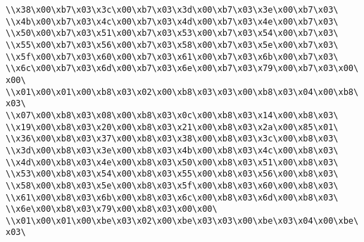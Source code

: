 \verb|\\x38\x00\xb7\x03\x3c\x00\xb7\x03\x3d\x00\xb7\x03\x3e\x00\xb7\x03\|\newline
\verb|\\x4b\x00\xb7\x03\x4c\x00\xb7\x03\x4d\x00\xb7\x03\x4e\x00\xb7\x03\|\newline
\verb|\\x50\x00\xb7\x03\x51\x00\xb7\x03\x53\x00\xb7\x03\x54\x00\xb7\x03\|\newline
\verb|\\x55\x00\xb7\x03\x56\x00\xb7\x03\x58\x00\xb7\x03\x5e\x00\xb7\x03\|\newline
\verb|\\x5f\x00\xb7\x03\x60\x00\xb7\x03\x61\x00\xb7\x03\x6b\x00\xb7\x03\|\newline
\verb|\\x6c\x00\xb7\x03\x6d\x00\xb7\x03\x6e\x00\xb7\x03\x79\x00\xb7\x03\x00\x00\|\newline
\verb|\\x01\x00\x01\x00\xb8\x03\x02\x00\xb8\x03\x03\x00\xb8\x03\x04\x00\xb8\x03\|\newline
\verb|\\x07\x00\xb8\x03\x08\x00\xb8\x03\x0c\x00\xb8\x03\x14\x00\xb8\x03\|\newline
\verb|\\x19\x00\xb8\x03\x20\x00\xb8\x03\x21\x00\xb8\x03\x2a\x00\x85\x01\|\newline
\verb|\\x36\x00\xb8\x03\x37\x00\xb8\x03\x38\x00\xb8\x03\x3c\x00\xb8\x03\|\newline
\verb|\\x3d\x00\xb8\x03\x3e\x00\xb8\x03\x4b\x00\xb8\x03\x4c\x00\xb8\x03\|\newline
\verb|\\x4d\x00\xb8\x03\x4e\x00\xb8\x03\x50\x00\xb8\x03\x51\x00\xb8\x03\|\newline
\verb|\\x53\x00\xb8\x03\x54\x00\xb8\x03\x55\x00\xb8\x03\x56\x00\xb8\x03\|\newline
\verb|\\x58\x00\xb8\x03\x5e\x00\xb8\x03\x5f\x00\xb8\x03\x60\x00\xb8\x03\|\newline
\verb|\\x61\x00\xb8\x03\x6b\x00\xb8\x03\x6c\x00\xb8\x03\x6d\x00\xb8\x03\|\newline
\verb|\\x6e\x00\xb8\x03\x79\x00\xb8\x03\x00\x00\|\newline
\verb|\\x01\x00\x01\x00\xbe\x03\x02\x00\xbe\x03\x03\x00\xbe\x03\x04\x00\xbe\x03\|\newline
